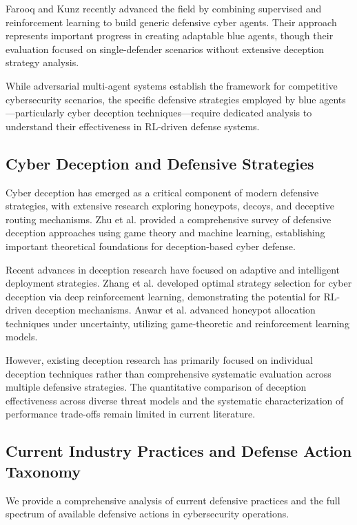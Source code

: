 \documentclass[12pt,oneside]{article}
\begin{document}
Farooq and Kunz \cite{farooq2025combining} recently advanced the field by combining supervised and reinforcement learning to build generic defensive cyber agents. Their approach represents important progress in creating adaptable blue agents, though their evaluation focused on single-defender scenarios without extensive deception strategy analysis.

While adversarial multi-agent systems establish the framework for competitive cybersecurity scenarios, the specific defensive strategies employed by blue agents—particularly cyber deception techniques—require dedicated analysis to understand their effectiveness in RL-driven defense systems.

\subsection{Cyber Deception and Defensive Strategies}

Cyber deception has emerged as a critical component of modern defensive strategies, with extensive research exploring honeypots, decoys, and deceptive routing mechanisms. Zhu et al. \cite{zhu2021survey} provided a comprehensive survey of defensive deception approaches using game theory and machine learning, establishing important theoretical foundations for deception-based cyber defense.

Recent advances in deception research have focused on adaptive and intelligent deployment strategies. Zhang et al. \cite{zhang2022optimal} developed optimal strategy selection for cyber deception via deep reinforcement learning, demonstrating the potential for RL-driven deception mechanisms. Anwar et al. \cite{anwar2022honeypot} advanced honeypot allocation techniques under uncertainty, utilizing game-theoretic and reinforcement learning models.

However, existing deception research has primarily focused on individual deception techniques rather than comprehensive systematic evaluation across multiple defensive strategies. The quantitative comparison of deception effectiveness across diverse threat models and the systematic characterization of performance trade-offs remain limited in current literature.

\subsection{Current Industry Practices and Defense Action Taxonomy}

We provide a comprehensive analysis of current defensive practices and the full spectrum of available defensive actions in cybersecurity operations.
\end{document}
